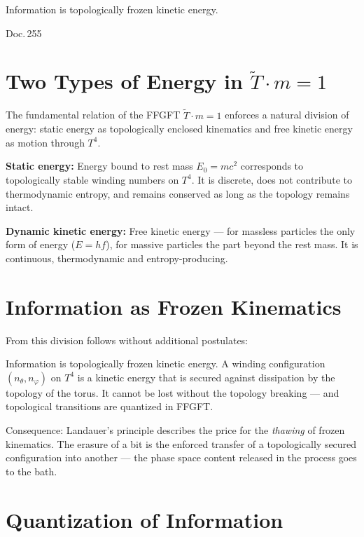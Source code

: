 \label{ch:info_als_energie}

\epigraph{Information is topologically frozen kinetic energy.}{Doc.\,255}

\section{Two Types of Energy in \texorpdfstring{$\tilde{T} \cdot m = 1$}{T·m = 1}}

The fundamental relation of the FFGFT $\tilde{T} \cdot m = 1$ enforces a natural
division of energy: static energy as topologically enclosed
kinematics and free kinetic energy as motion through $T^4$.

\textbf{Static energy:} Energy bound to rest mass $E_0 = mc^2$
corresponds to topologically stable winding numbers on $T^4$. It is discrete, does
not contribute to thermodynamic entropy, and remains conserved as long as the
topology remains intact.

\textbf{Dynamic kinetic energy:} Free kinetic energy --- for
massless particles the only form of energy ($E = hf$), for massive
particles the part beyond the rest mass. It is continuous,
thermodynamic and entropy-producing.

\section{Information as Frozen Kinematics}

From this division follows without additional postulates:

\begin{keyresult}
Information is topologically frozen kinetic energy. A
winding configuration $(n_\theta, n_\varphi)$ on $T^4$ is a
kinetic energy that is secured against dissipation by the topology of the torus.
It cannot be lost without the topology breaking ---
and topological transitions are quantized in FFGFT.
\end{keyresult}

Consequence: Landauer's principle describes the price for the
\emph{thawing} of frozen kinematics. The erasure of a bit is the
enforced transfer of a topologically secured configuration into
another --- the phase space content released in the process goes to the bath.

\section{Quantization of Information}

